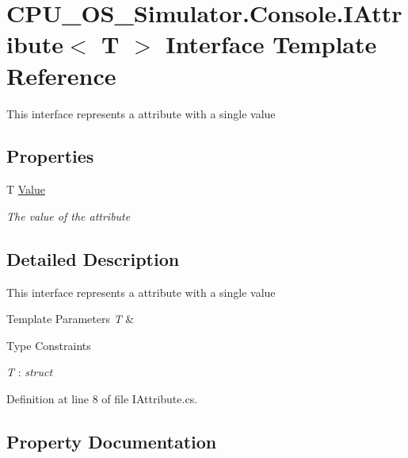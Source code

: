 \hypertarget{interface_c_p_u___o_s___simulator_1_1_console_1_1_i_attribute}{}\section{C\+P\+U\+\_\+\+O\+S\+\_\+\+Simulator.\+Console.\+I\+Attribute$<$ T $>$ Interface Template Reference}
\label{interface_c_p_u___o_s___simulator_1_1_console_1_1_i_attribute}


This interface represents a attribute with a single value  


\subsection*{Properties}
\begin{DoxyCompactItemize}
\item 
T \hyperlink{interface_c_p_u___o_s___simulator_1_1_console_1_1_i_attribute_ad23a11dc6f96a7ed120819db250e3f4a}{Value}
\begin{DoxyCompactList}\small\item\em The value of the attribute \end{DoxyCompactList}\end{DoxyCompactItemize}


\subsection{Detailed Description}
This interface represents a attribute with a single value 


\begin{DoxyTemplParams}{Template Parameters}
{\em T} & \\
\hline
\end{DoxyTemplParams}
\begin{Desc}
\item[Type Constraints]\begin{description}
\item[{\em T} : {\em struct}]\end{description}
\end{Desc}


Definition at line 8 of file I\+Attribute.\+cs.



\subsection{Property Documentation}
\hypertarget{interface_c_p_u___o_s___simulator_1_1_console_1_1_i_attribute_ad23a11dc6f96a7ed120819db250e3f4a}{}
